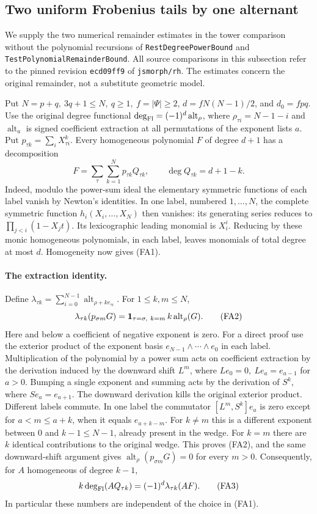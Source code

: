 \subsection{Two uniform Frobenius tails by one alternant}
\label{sec:flag-tail-alternants}
We supply the two numerical remainder estimates in the tower comparison
without the polynomial recursions of \texttt{RestDegreePowerBound} and
\texttt{TestPolynomialRemainderBound}. All source comparisons in this
subsection refer to the pinned revision \texttt{ecd09ff9} of
\texttt{jsmorph/rh}. The estimates concern the original remainder, not
a substitute geometric model.

Put \(N=p+q,\ 3q+1\le N,\ q\ge1,\ f=|\Psi|\ge2\),
\(d=fN(N-1)/2\), and \(d_0=fpq\). Use the original degree functional
\(\deg_{\rm Fl}=(-1)^d\operatorname{alt}_{\rho}\), where
\(\rho_{\tau i}=N-1-i\) and \(\operatorname{alt}_a\) is signed
coefficient extraction at all permutations of the exponent lists \(a\).
Put \(p_{\tau k}=\sum_i X_{\tau i}^k\).
Every homogeneous polynomial \(F\) of degree \(d+1\) has a decomposition
\[
 F=\sum_{\tau}\sum_{k=1}^{N}p_{\tau k}Q_{\tau k},
 \qquad \deg Q_{\tau k}=d+1-k.
 \tag{FA1}
\]
Indeed, modulo the power-sum ideal the elementary symmetric functions
of each label vanish by Newton's identities. In one label, numbered
\(1,\ldots,N\), the complete symmetric function
\(h_i(X_i,\ldots,X_N)\) then vanishes: its generating series reduces
to \(\prod_{j<i}(1-X_jt)\). Its lexicographic leading monomial is
\(X_i^i\). Reducing by these monic homogeneous polynomials, in each
label, leaves monomials of total degree at most \(d\).
Homogeneity now gives (FA1).

\paragraph{The extraction identity.}
Define \(\lambda_{\tau k}=\sum_{i=0}^{N-1}
\operatorname{alt}_{\rho+k e_{\tau i}}\). For \(1\le k,m\le N\),
\[
 \lambda_{\tau k}(p_{\sigma m}G)
 ={\bf1}_{\tau=\sigma,\ k=m}\, k\operatorname{alt}_{\rho}(G).
 \tag{FA2}
\]
Here and below a coefficient of negative exponent is zero.
For a direct proof use the exterior product of the exponent basis
\(e_{N-1}\wedge\cdots\wedge e_0\) in each label. Multiplication of
the polynomial by a power sum acts on coefficient extraction
by the derivation induced by the downward shift \(L^m\), where
\(Le_0=0,\ Le_a=e_{a-1}\) for \(a>0\).
Bumping a single exponent and summing acts by the derivation of
\(S^k\), where \(Se_a=e_{a+1}\).
The downward derivation kills the original exterior product.
Different labels commute. In one label the commutator
\([L^m,S^k]e_a\) is zero except for \(a<m\le a+k\), when it equals
\(e_{a+k-m}\). For \(k\ne m\) this is a different exponent
between \(0\) and \(k-1\le N-1\), already present in the wedge.
For \(k=m\) there are \(k\) identical contributions to the
original wedge. This proves (FA2), and the same downward-shift
argument gives
\(\operatorname{alt}_{\rho}(p_{\sigma m}G)=0\) for every \(m>0\).
Consequently, for \(A\) homogeneous of degree \(k-1\),
\[
 k\deg_{\rm Fl}(A Q_{\tau k})
 =(-1)^d\lambda_{\tau k}(A F).
 \tag{FA3}
\]
In particular these numbers are independent of the choice in (FA1).


